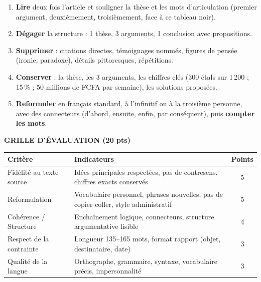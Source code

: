 \documentclass[11pt]{article}
\begin{document}
\begin{methode}
\begin{enumerate}
    \item \textbf{Lire} deux fois l'article et souligner la thèse et les mots d'articulation (\og{}premier argument\fg{}, \og{}deuxièmement\fg{}, \og{}troisièmement\fg{}, \og{}face à ce tableau noir\fg{}).
    \item \textbf{Dégager} la structure : 1 thèse, 3 arguments, 1 conclusion avec propositions.
    \item \textbf{Supprimer} : citations directes, témoignages nommés, figures de pensée (ironie, paradoxe), détails pittoresques, répétitions.
    \item \textbf{Conserver} : la thèse, les 3 arguments, les chiffres clés (300 étals sur 1\,200 ; 15\,\% ; 50 millions de FCFA par semaine), les solutions proposées.
    \item \textbf{Reformuler} en français standard, à l'infinitif ou à la troisième personne, avec des connecteurs (d'abord, ensuite, enfin, par conséquent), puis \textbf{compter les mots}.
\end{enumerate}
\end{methode}

\begin{center}
\textbf{GRILLE D'ÉVALUATION (20 pts)}
\end{center}
\begin{center}
\begin{tabularx}{\linewidth}{|l|X|c|}\hline
\rowcolor{popblueL}\textbf{Critère} & \textbf{Indicateurs} & \textbf{Points} \\ \hline
Fidélité au texte source & Idées principales respectées, pas de contresens, chiffres exacts conservés & 5 \\ \hline
Reformulation & Vocabulaire personnel, phrases nouvelles, pas de copier-coller, style administratif & 5 \\ \hline
Cohérence / Structure & Enchaînement logique, connecteurs, structure argumentative lisible & 4 \\ \hline
Respect de la contrainte & Longueur 135--165 mots, format rapport (objet, destinataire, date) & 3 \\ \hline
Qualité de la langue & Orthographe, grammaire, syntaxe, vocabulaire précis, impersonnalité & 3 \\ \hline
\end{tabularx}
\end{center}
\end{document}
